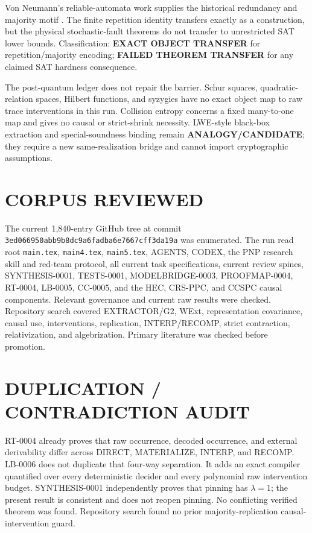 \documentclass[11pt]{article}
\begin{document}
Von Neumann's reliable-automata work supplies the historical redundancy and
majority motif \cite{vn}.  The finite repetition identity transfers exactly
as a construction, but the physical stochastic-fault theorems do not transfer
to unrestricted SAT lower bounds.  Classification: \textbf{EXACT OBJECT
TRANSFER} for repetition/majority encoding; \textbf{FAILED THEOREM TRANSFER}
for any claimed SAT hardness consequence.

The post-quantum ledger does not repair the barrier.  Schur squares,
quadratic-relation spaces, Hilbert functions, and syzygies have no exact object
map to raw trace interventions in this run.  Collision entropy concerns a
fixed many-to-one map and gives no causal or strict-shrink necessity.
LWE-style black-box extraction and special-soundness binding remain
\textbf{ANALOGY/CANDIDATE}; they require a new same-realization bridge and
cannot import cryptographic assumptions.

\section{CORPUS REVIEWED}
The current 1,840-entry GitHub tree at commit
\texttt{3ed066950abb9b8dc9a6fadba6e7667cff3da19a} was enumerated.  The run read
root \texttt{main.tex}, \texttt{main4.tex}, \texttt{main5.tex}, AGENTS,
CODEX, the PNP research skill and red-team protocol, all current task
specifications, current review spines, SYNTHESIS-0001, TESTS-0001,
MODELBRIDGE-0003, PROOFMAP-0004, RT-0004, LB-0005, CC-0005, and the HEC,
CRS-PPC, and CCSPC causal components.  Relevant governance and current raw
results were checked.  Repository search covered EXTRACTOR/G2, WExt,
representation covariance, causal use, interventions, replication,
INTERP/RECOMP, strict contraction, relativization, and algebrization.
Primary literature was checked before promotion.

\section{DUPLICATION / CONTRADICTION AUDIT}
RT-0004 already proves that raw occurrence, decoded occurrence, and external
derivability differ across DIRECT, MATERIALIZE, INTERP, and RECOMP.  LB-0006
does not duplicate that four-way separation.  It adds an exact compiler
quantified over every deterministic decider and every polynomial raw
intervention budget.  SYNTHESIS-0001 independently proves that pinning has
$\lambda=1$; the present result is consistent and does not reopen pinning.
No conflicting verified theorem was found.  Repository search found no prior
majority-replication causal-intervention guard.
\end{document}
